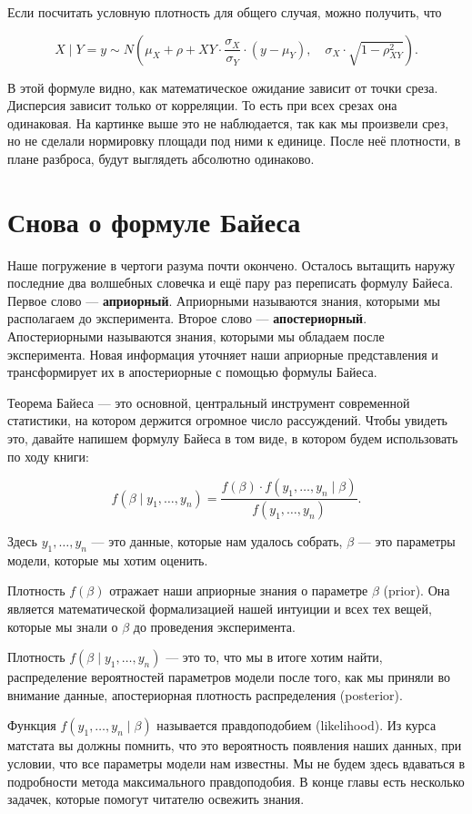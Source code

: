 \documentclass[12pt, a4paper, oneside]{extreport}
\def \b{\beta}
\newcommand{\indef}[1]{\textbf{#1}}     %
\theoremstyle{plain}              %
\theoremstyle{definition}         %
\begin{document}
Если посчитать условную плотность для общего случая, можно получить, что 

\[ X \mid Y=y \sim N \left(\mu_X + \rho+{XY} \cdot \frac{\sigma_X}{\sigma_Y} \cdot(y - \mu_Y), \quad \sigma_X \cdot \sqrt{1- \rho_{XY}^2} \right).\]

В этой формуле видно, как математическое ожидание зависит от точки среза. Дисперсия зависит только от корреляции. То есть при всех срезах она одинаковая. На картинке выше это не наблюдается, так как мы произвели срез, но не сделали нормировку площади под ними к единице. После неё плотности, в плане разброса, будут выглядеть абсолютно одинаково. 


\section{Снова о формуле Байеса}

Наше погружение в чертоги разума почти окончено. Осталось вытащить наружу последние два волшебных словечка и ещё пару раз переписать формулу Байеса.  Первое слово --- \indef{априорный}. Априорными называются знания, которыми мы располагаем до эксперимента. Второе слово --- \indef{апостериорный}. Апостериорными называются знания, которыми мы обладаем после эксперимента. Новая информация уточняет наши априорные представления и трансформирует их в апостериорные с помощью формулы Байеса.

Теорема Байеса --- это основной, центральный инструмент современной статистики, на котором держится огромное число рассуждений. Чтобы увидеть это, давайте напишем формулу Байеса в том виде, в котором будем использовать по ходу книги: 

\[ 
f(\b \mid y_1, \ldots, y_n) = \frac{f(\b) \cdot f(y_1, \ldots, y_n \mid \b)}{f(y_1, \ldots, y_n)}.
\]

Здесь $y_1, \ldots, y_n$ --- это данные, которые нам удалось собрать, $\b$ --- это параметры модели, которые мы хотим оценить.   

Плотность $f(\b)$ отражает наши априорные знания о параметре $\b$ (prior).  Она является математической формализацией нашей интуиции и всех тех вещей, которые мы знали о $\b$ до проведения эксперимента. 

Плотность $f(\b \mid y_1, \ldots, y_n) $ --- это то, что мы в итоге хотим найти, распределение вероятностей параметров модели после того, как мы приняли во внимание данные, апостериорная плотность распределения (posterior).  

 Функция $f(y_1, \ldots, y_n \mid \b )$ называется правдоподобием (likelihood). Из курса матстата вы должны помнить, что это вероятность появления наших данных, при условии, что все параметры модели нам известны. Мы не будем здесь вдаваться в подробности метода максимального правдоподобия. В конце главы есть несколько задачек, которые помогут читателю освежить знания. 
 
\end{document}
